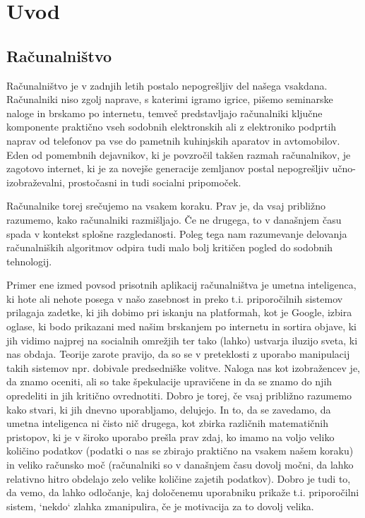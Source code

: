 \chapter{Uvod}

\section{Računalništvo}

Računalništvo je v zadnjih letih postalo nepogrešljiv del našega vsakdana. Računalniki niso zgolj naprave, s katerimi igramo igrice, pišemo seminarske naloge in brskamo po internetu, temveč predstavljajo računalniki ključne komponente praktično vseh sodobnih elektronskih ali z elektroniko podprtih naprav od telefonov pa vse do pametnih kuhinjskih aparatov in avtomobilov. Eden od pomembnih dejavnikov, ki je povzročil takšen razmah računalnikov, je zagotovo internet, ki je za novejše generacije zemljanov postal nepogrešljiv učno-izobraževalni, prostočasni in tudi socialni pripomoček. 

Računalnike torej srečujemo na vsakem koraku.  Prav je, da vsaj približno razumemo, kako računalniki razmišljajo. Če ne drugega, to v današnjem času spada v kontekst splošne razgledanosti. Poleg tega nam razumevanje delovanja računalniških algoritmov odpira tudi malo bolj kritičen pogled do sodobnih tehnologij. 

Primer ene izmed povsod prisotnih aplikacij računalništva je umetna inteligenca, ki hote ali nehote posega v našo zasebnost in preko t.i. priporočilnih sistemov prilagaja zadetke, ki jih dobimo pri iskanju na platformah, kot je Google, izbira oglase, ki bodo prikazani med našim brskanjem po internetu in sortira objave, ki jih vidimo najprej na socialnih omrežjih ter tako (lahko) ustvarja iluzijo sveta, ki nas obdaja. Teorije zarote pravijo, da so se v preteklosti z uporabo manipulacij takih sistemov npr. dobivale predsedniške volitve. Naloga nas kot izobražencev je, da znamo oceniti, ali so take špekulacije upravičene in da se znamo do njih opredeliti in jih kritično ovrednotiti. Dobro je torej, če vsaj približno razumemo kako stvari, ki jih dnevno uporabljamo, delujejo. In to, da se zavedamo, da umetna inteligenca ni čisto nič drugega, kot zbirka različnih matematičnih pristopov, ki je v široko uporabo prešla prav zdaj, ko imamo na voljo veliko količino podatkov (podatki o nas se zbirajo praktično na vsakem našem koraku) in veliko računsko moč (računalniki so v današnjem času dovolj močni, da lahko relativno hitro obdelajo zelo velike količine zajetih podatkov). Dobro je tudi to, da vemo, da lahko odločanje, kaj določenemu uporabniku prikaže t.i. priporočilni sistem, `nekdo` zlahka zmanipulira, če je motivacija za to dovolj velika.

